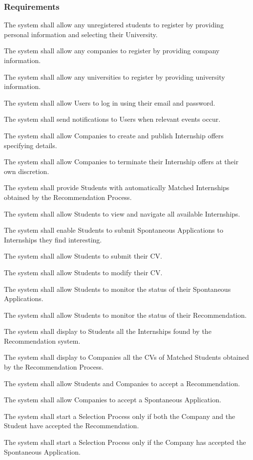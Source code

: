 \subsubsection{Requirements}
\begin{enumerate}[label={\color{titleColor}[R\arabic*]}]
    \item The system shall allow any unregistered students to register by providing personal information and selecting their University.
    \item The system shall allow any companies to register by providing company information.
    \item The system shall allow any universities to register by providing university information.
    \item The system shall allow Users to log in using their email and password.
    \item The system shall send notifications to Users when relevant events occur.
    
    \item The system shall allow Companies to create and publish Internship offers specifying details.
    \item The system shall allow Companies to terminate their Internship offers at their own discretion.
    \item The system shall provide Students with automatically Matched Internships obtained by the Recommendation Process.
    \item The system shall allow Students to view and navigate all available Internships.
    \item The system shall enable Students to submit Spontaneous Applications to Internships they find interesting.
    \item The system shall allow Students to submit their CV.
    \item The system shall allow Students to modify their CV.
    \item The system shall allow Students to monitor the status of their Spontaneous Applications.
    \item The system shall allow Students to monitor the status of their Recommendation.
    
    \item The system shall display to Students all the Internships found by the Recommendation system.
    \item The system shall display to Companies all the CVs of Matched Students obtained by the Recommendation Process.
    \item The system shall allow Students and Companies to accept a Recommendation.
    \item The system shall allow Companies to accept a Spontaneous Application.
    \item The system shall start a Selection Process only if both the Company and the Student have accepted the Recommendation.
    \item The system shall start a Selection Process only if the Company has accepted the Spontaneous Application.
    

\end{enumerate}
